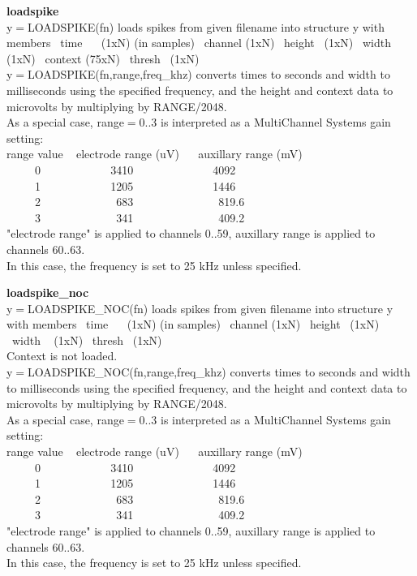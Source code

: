 \item {\bf loadspike}\\
y{$=$}LOADSPIKE(fn) loads spikes from given filename into structure y
with members
 ~time ~ ~(1xN) (in samples)
 ~channel (1xN)
 ~height ~(1xN)
 ~width ~ (1xN)
 ~context (75xN)
 ~thresh ~(1xN)
\\
y{$=$}LOADSPIKE(fn,range,freq\_khz) converts times to seconds and width to
milliseconds using the specified frequency, and the height and
context data to microvolts by multiplying by RANGE/2048.
\\
As a special case, range{$=$}0..3 is interpreted as a MultiChannel Systems 
gain setting:
\\
range value ~ electrode range (uV) ~ ~auxillary range (mV)
\\
\mbox{~}\mbox{~}\mbox{~}\mbox{~}\mbox{~}0 ~ ~ ~ ~ ~ ~ ~ 3410 ~ ~ ~ ~ ~ ~ ~ ~ 4092
\\
\mbox{~}\mbox{~}\mbox{~}\mbox{~}\mbox{~}1 ~ ~ ~ ~ ~ ~ ~ 1205 ~ ~ ~ ~ ~ ~ ~ ~ 1446
\\
\mbox{~}\mbox{~}\mbox{~}\mbox{~}\mbox{~}2 ~ ~ ~ ~ ~ ~ ~ ~683 ~ ~ ~ ~ ~ ~ ~ ~ ~819.6
\\
\mbox{~}\mbox{~}\mbox{~}\mbox{~}\mbox{~}3 ~ ~ ~ ~ ~ ~ ~ ~341 ~ ~ ~ ~ ~ ~ ~ ~ ~409.2
\\
"electrode range" is applied to channels 0..59, auxillary range is
applied to channels 60..63.
\\
In this case, the frequency is set to 25 kHz unless specified.

\item {\bf loadspike\_noc}\\
y{$=$}LOADSPIKE\_NOC(fn) loads spikes from given filename into structure y
with members
 ~time ~ ~(1xN) (in samples)
 ~channel (1xN)
 ~height ~(1xN)
 ~width ~ (1xN)
 ~thresh ~(1xN)
\\
Context is not loaded.
\\
y{$=$}LOADSPIKE\_NOC(fn,range,freq\_khz) converts times to seconds and width to
milliseconds using the specified frequency, and the height and
context data to microvolts by multiplying by RANGE/2048.
\\
As a special case, range{$=$}0..3 is interpreted as a MultiChannel Systems
gain setting:
\\
range value ~ electrode range (uV) ~ ~auxillary range (mV)
\\
\mbox{~}\mbox{~}\mbox{~}\mbox{~}\mbox{~}0 ~ ~ ~ ~ ~ ~ ~ 3410 ~ ~ ~ ~ ~ ~ ~ ~ 4092
\\
\mbox{~}\mbox{~}\mbox{~}\mbox{~}\mbox{~}1 ~ ~ ~ ~ ~ ~ ~ 1205 ~ ~ ~ ~ ~ ~ ~ ~ 1446
\\
\mbox{~}\mbox{~}\mbox{~}\mbox{~}\mbox{~}2 ~ ~ ~ ~ ~ ~ ~ ~683 ~ ~ ~ ~ ~ ~ ~ ~ ~819.6
\\
\mbox{~}\mbox{~}\mbox{~}\mbox{~}\mbox{~}3 ~ ~ ~ ~ ~ ~ ~ ~341 ~ ~ ~ ~ ~ ~ ~ ~ ~409.2
\\
"electrode range" is applied to channels 0..59, auxillary range is
applied to channels 60..63.
\\
In this case, the frequency is set to 25 kHz unless specified.

